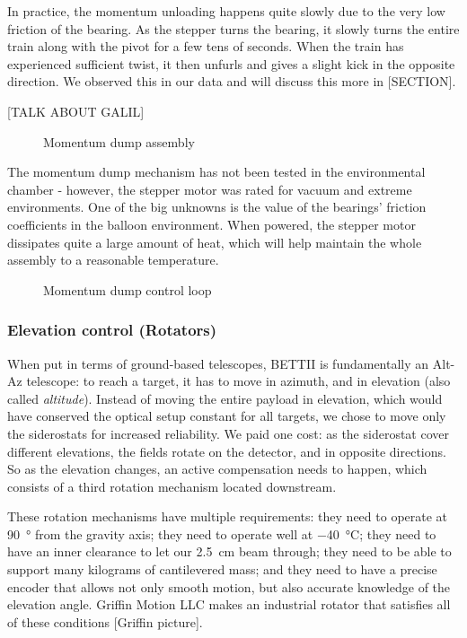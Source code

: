 In practice, the momentum unloading happens quite slowly due to the very low friction of the bearing. As the stepper turns the bearing, it slowly turns the entire train along with the pivot for a few tens of seconds. When the train has experienced sufficient twist, it then unfurls and gives a slight kick in the opposite direction. We observed this in our data and will discuss this more in [SECTION].

[TALK ABOUT GALIL]
\begin{figure}[!ht]
	\centering
	
	\caption[Momentum dump assembly]{Momentum dump assembly}
	\label{fig:rotator}
    \end{figure}

The momentum dump mechanism has not been tested in the environmental chamber - however, the stepper motor was rated for vacuum and extreme environments. One of the big unknowns is the value of the bearings' friction coefficients in the balloon environment. When powered, the stepper motor dissipates quite a large amount of heat, which will help maintain the whole assembly to a reasonable temperature. 

\begin{figure}[!ht]
	\centering
	
	\caption[Momentum dump PID]{Momentum dump control loop}
	\label{fig:MomDumpPID}
    \end{figure}



\subsubsection{Elevation control (Rotators)}

When put in terms of ground-based telescopes, BETTII is fundamentally an Alt-Az telescope: to reach a target, it has to move in azimuth, and in elevation (also called \textit{altitude}). Instead of moving the entire payload in elevation, which would have conserved the optical setup constant for all targets, we chose to move only the siderostats for increased reliability. We paid one cost: as the siderostat cover different elevations, the fields rotate on the detector, and in opposite directions. So as the elevation changes, an active compensation needs to happen, which consists of a third rotation mechanism located downstream.

These rotation mechanisms have multiple requirements: they need to operate at \SI{90}{\degree} from the gravity axis; they need to operate well at \SI{-40}{\celsius}; they need to have an inner clearance to let our \SI{2.5}{\cm} beam through; they need to be able to support many kilograms of cantilevered mass; and they need to have a precise encoder that allows not only smooth motion, but also accurate knowledge of the elevation angle. Griffin Motion LLC makes an industrial rotator that satisfies all of these conditions [Griffin picture].

